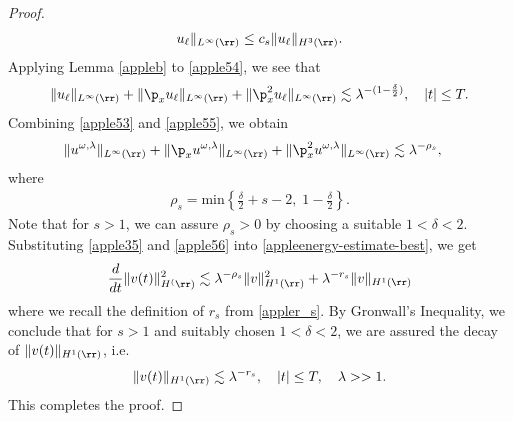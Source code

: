 \begin{proof}
\begin{equation}
\begin{split}
		u_\ell\|_{L^\infty(\rr)} \le c_s \|u_\ell\|_{H^3(\rr)}.
		\label{apple54}
	\end{split}
\end{equation}
Applying Lemma \ref{appleb} to \eqref{apple54}, we see that
\begin{equation}
	\begin{split}
		\|u_\ell\|_{L^\infty(\rr)} + \|\p_x u_\ell \|_{L^\infty(\rr)} + \|\p_x^2
		u_\ell\|_{L^\infty(\rr)} \lesssim \lambda^{-(1 - \frac{\delta}{2})},
		\quad |t| \le T.
		\label{apple55}
	\end{split}
\end{equation}
Combining \eqref{apple53} and \eqref{apple55}, we obtain
\begin{equation}
	\begin{split}
		\|u^{\omega,\lambda}\|_{L^\infty(\rr)} + \|\p_x u^{\omega,\lambda}\|_{L^\infty(\rr)} + \|\p_x^2
		u^{\omega,\lambda}\|_{L^\infty(\rr)}
		& \lesssim \lambda^{-\rho_s},
		\label{apple56}
	\end{split}
\end{equation}
where
\begin{equation}
	\begin{split}
		\rho_s = \text{min} \left\{ \frac{\delta}{2} + s -2, \; 1-
		\frac{\delta}{2} \right\}.
		\label{apple57}
	\end{split}
\end{equation}
Note that for $s>1$, we can assure $\rho_s > 0$
by choosing a suitable $1<\delta<2$.
Substituting \eqref{apple35} and \eqref{apple56} into \eqref{appleenergy-estimate-best},
we get
\begin{equation}
	\label{apple58}
	\frac{d}{dt} \|v(t)\|_{H^(\rr)}^2 \lesssim \lambda^{-\rho_s}
	\|v\|_{H^1(\rr)}^2 + \lambda^{-r_s}
	\|v \|_{H^1(\rr)}
\end{equation}
where we recall the definition of $r_s$ from \eqref{appler_s}. By Gronwall's Inequality, we conclude that for $s>1$ and
suitably chosen $1<\delta<2$, we are assured the
decay of $\|v(t)\|_{H^1(\rr)}$, i.e. 
\begin{equation}
	\label{appleen-est-fin!}
	\|v(t)\|_{H^1(\rr)} 
	\lesssim
	\lambda^{-r_s}, \quad |t| \le T,\quad \lambda>>1 . 
\end{equation}
This completes the proof. 
\end{proof}
%
%
%
